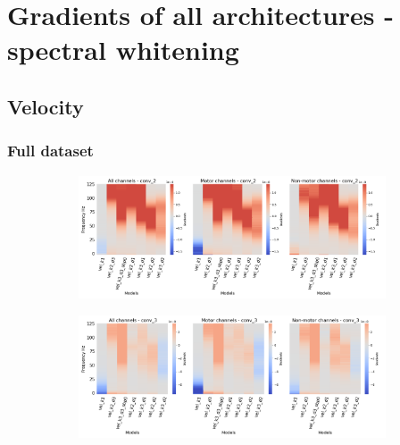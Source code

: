 \chapter{Gradients of all architectures - spectral whitening}\label{appendixD}

\section*{Velocity}\label{sec:velocity-appendixD}

\subsection*{Full dataset}\label{subsec:vel-full-dataset-appendixD}
\begin{figure}[!htpb]
\centering
\begin{subfigure}[b]{\textwidth}
   \includegraphics[width=1\linewidth]{img/appendix/D/conv-2/m/vel_model_gradients_all_kinds}
   \caption{}
   \label{fig:vel-pw-full-grads-conv-2}
\end{subfigure}

\begin{subfigure}[b]{\textwidth}
   \includegraphics[width=1\linewidth]{img/appendix/D/conv-3/m/vel_model_gradients_all_kinds}
   \caption{}
   \label{fig:vel-pw-full-grads-conv-3}
\end{subfigure}


\end{figure}
